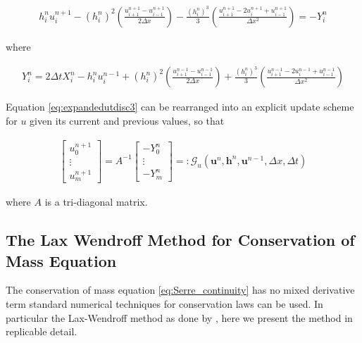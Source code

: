 \documentclass[SingleSpace,12pt,Proceedings]{Serre_ASCE}
\begin{document}
\begin{linenomath*}
\begin{gather}
h^{n}_iu^{n+1}_i - \left(h^{n}_i\right)^2 \left(\frac{u^{n+1}_{i+1} -u^{n+1}_{i-1} }{2 \Delta x}\right) - \frac{\left(h^{n}_i\right)^3}{3}\left(\frac{u^{n+1}_{i+1} - 2u^{n+1}_{i} + u^{n+1}_{i-1} }{\Delta x^2}\right) = - Y^n_i
\label{eq:expandedutdisc3}
\end{gather}
\end{linenomath*}
where
\begin{linenomath*}
\begin{gather*}
Y_i^n = 2\Delta tX_i^{n} - h_i^{n}u_i^{n-1} + \left(h_i^{n}\right)^2\left(\frac{u^{n-1}_{i+1} -u^{n-1}_{i-1} }{2 \Delta x}\right) + \frac{\left(h_i^{n}\right)^3}{3}\left(\frac{u^{n-1}_{i+1} - 2u^{n-1}_{i} + u^{n-1}_{i-1} }{\Delta x^2}\right)
\label{eq:expandfactor Xp}
\end{gather*}
\end{linenomath*}
Equation \eqref{eq:expandedutdisc3} can be rearranged into an explicit update scheme for $u$ given its current and previous values, so that
\begin{linenomath*}
\begin{gather}
\left[\begin{array}{c}
 u^{n+1}_0 \\
 \vdots \\
 u^{n+1}_m \end{array}\right]
 = A^{-1} \left[\begin{array}{c}
  -Y^n_0 \\
  \vdots \\
  -Y^n_m \end{array}\right] =: \mathcal{G}_u\left(\boldsymbol{u}^n,\boldsymbol{h}^n, \boldsymbol{u}^{n-1}, \Delta x, \Delta t \right)
\label{eq:FDcentforu}
\end{gather}
\end{linenomath*}
where $A$ is a tri-diagonal matrix.

\subsection{The Lax Wendroff Method for Conservation of Mass Equation}
\label{section:}
The conservation of mass equation \eqref{eq:Serre_continuity} has no mixed derivative term standard numerical techniques for conservation laws can be used. In particular the Lax-Wendroff method as done by , here we present the method in replicable detail.
\end{document}
